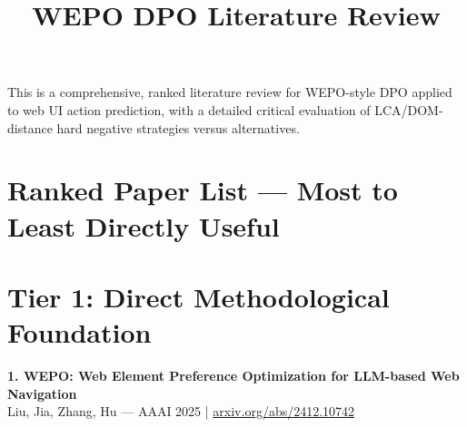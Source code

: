 \documentclass[pdflatex,sn-mathphys-num]{sn-jnl}
\theoremstyle{thmstyleone}
\theoremstyle{thmstyletwo}
\theoremstyle{thmstylethree}
\begin{document}
\title[WEPO DPO Literature Review]{WEPO DPO Literature Review}
\author*[1]{ }



\maketitle

This is a comprehensive, ranked literature review for WEPO-style DPO applied to web UI action prediction, with a detailed critical evaluation of LCA/DOM-distance hard negative strategies versus alternatives.

\section{Ranked Paper List --- Most to Least Directly Useful}

\section{Tier 1: Direct Methodological Foundation}

\textbf{1. WEPO: Web Element Preference Optimization for LLM-based Web Navigation} \\
Liu, Jia, Zhang, Hu --- AAAI 2025 | \href{https://arxiv.org/abs/2412.10742}{arxiv.org/abs/2412.10742}
\end{document}
